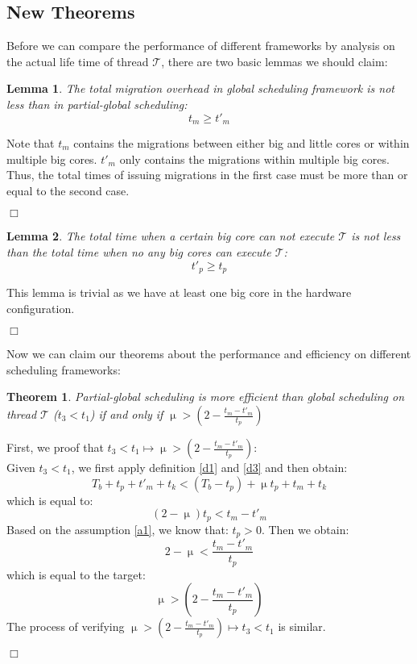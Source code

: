 \documentclass[pageno]{jpaper}
\newtheorem{theorem}{\bf Theorem}
\newenvironment{proof}{\par \noindent {\bf Proof:}}{\begin{flushright}$\Box$\end{flushright}\par \noindent}
\newtheorem{lemma}{\bf Lemma}
\begin{document}
\subsection{New Theorems}
Before we can compare the performance of different frameworks by analysis on the actual life time of thread $\mathcal{T}$, there are two basic lemmas we should claim: 

\begin{lemma} \label{l1}The total migration overhead in global scheduling framework is not less than in partial-global scheduling: $$t_m \geq t'_m$$
\end{lemma}

\begin{proof} Note that $t_m$ contains the migrations between either big and little cores or within multiple big cores. $t'_m$ only contains the migrations within multiple big cores. Thus, the total times of issuing migrations in the first case must be more than or equal to the second case.
\end{proof}


\begin{lemma}\label{l2} The total time when a certain big core can not execute $\mathcal{T}$ is not less than the total time when no any big cores can execute $\mathcal{T}$: $$t'_p \geq t_p$$
\end{lemma}

\begin{proof} This lemma is trivial as we have at least one big core in the hardware configuration.
\end{proof}

Now we can claim our theorems about the performance and efficiency on different scheduling frameworks:
\begin{theorem}  \label{t1}  Partial-global scheduling is more efficient than global scheduling on thread $\mathcal{T}$ ($t_3 < t_1$) if and only if $\upmu > (2-\frac{t_m - t'_m}{t_p})$
\end{theorem} 

\begin{proof} 
First, we proof that $t_3 < t_1 \mapsto  \upmu > (2-\frac{t_m - t'_m}{t_p})$:\\ Given $t_3 < t_1$, we first apply definition \ref{d1} and \ref{d3} and then obtain: $$ T_b + t_p + t'_m + t_k < (T_b - t_p) + \upmu t_p + t_m + t_k$$ which is equal to: $$ (2 - \upmu) t_p < t_m - t'_m$$ Based on the assumption \ref{a1}, we know that: $t_p > 0$. Then we obtain: $$ 2 - \upmu < \frac{t_m - t'_m}{t_p}$$ which is equal to the target: $$  \upmu > (2-\frac{t_m - t'_m}{t_p}) $$ The process of verifying $ \upmu > (2-\frac{t_m - t'_m}{t_p}) \mapsto t_3 < t_1$ is similar.
\end{proof}
\end{document}
